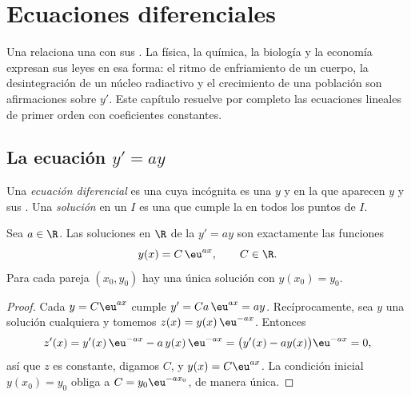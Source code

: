 \chapter{Ecuaciones diferenciales}\label{ch:g12:diffeq}

Una  relaciona una  con sus . La física,
la química, la biología y la economía expresan sus leyes en esa forma: el
ritmo de enfriamiento de un cuerpo, la desintegración de un núcleo
radiactivo y el crecimiento de una población son afirmaciones sobre $y'$.
Este capítulo resuelve por completo las ecuaciones lineales de primer orden
con coeficientes constantes.

\section{La ecuación \texorpdfstring{$y' = ay$}{y' = ay}}

\begin{definition}\label{def:g12:diffeq:ode}
Una \emph{ecuación diferencial} es una 
cuya incógnita es una  $y$ y en la que aparecen $y$ y sus .
Una \emph{solución} en un  $I$ es una   que cumple
la  en todos los puntos de $I$.
\end{definition}

\begin{theorem}[Soluciones de $y' = ay$]\label{thm:g12:diffeq:homogeneous}
Sea $a \in \R$. Las soluciones en $\R$ de la  $y' = ay$ son
exactamente las funciones
\[
y(x) = C\,\eu^{ax}, \qquad C \in \R .
\]
Para cada pareja $(x_0, y_0)$ hay una única solución con $y(x_0) = y_0$.
\end{theorem}

\begin{proof}
Cada $y = C\eu^{ax}$ cumple $y' = Ca\,\eu^{ax} = ay$. Recíprocamente, sea
$y$ una solución cualquiera y tomemos $z(x) = y(x)\,\eu^{-ax}$. Entonces
\[
z'(x) = y'(x)\,\eu^{-ax} - a\,y(x)\,\eu^{-ax}
= \bigl(y'(x) - a y(x)\bigr)\eu^{-ax} = 0,
\]
así que $z$ es constante, digamos $C$, y $y(x) = C\eu^{ax}$. La condición
inicial $y(x_0) = y_0$ obliga a $C = y_0 \eu^{-a x_0}$, de manera única.
\end{proof}

